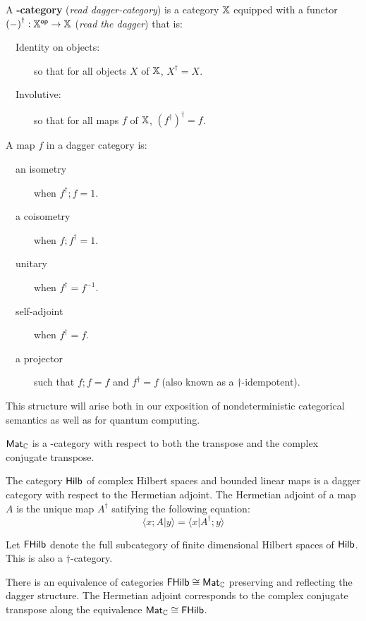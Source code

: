 \begin{definition}
A {\bf \dag-category} ({\em read dagger-category}) is a category $\mathbb{X}$ equipped with a functor ${(-)}^\dag:\mathbb{X}^{\mathsf{op}}\to\mathbb{X}$ ({\em read the dagger}) that is:

\begin{description}
\item[\ \ Identity on objects:] so that for all objects $X$ of $\mathbb{X}$, $X^\dag = X$.
\item[\ \ Involutive:] so that for all maps $f$ of $\mathbb{X}$, $(f^\dag)^\dag = f$.
\end{description}

A map $f$ in a dagger category is:

\begin{description}
\item[\ \ an isometry] when $f^\dag; f = 1$.
\item[\ \ a coisometry] when $f; f^\dag = 1$.
\item[\ \ unitary] when $f^\dag = f^{-1}$.
\item[\ \ self-adjoint] when $f^\dag=f$.
\item[\ \ a projector] such that $f;f=f$ and $f^\dag=f$ (also known as a $\dag$-idempotent).
\end{description}

\end{definition}

This structure will arise both in our exposition of nondeterministic categorical semantics as well as for quantum computing.


\begin{example}
 $\mathsf{Mat}_{\mathbb{C}}$ is a \dag-category with respect to both the transpose and the complex conjugate transpose.
\end{example}

\begin{example}

The category $\mathsf{Hilb}$ of complex Hilbert spaces and bounded linear maps is a dagger category with respect to the Hermetian adjoint.  The Hermetian adjoint of a map $A$ is the unique map $A^\dag$ satifying the following equation:
$$
\langle x;A|y\rangle = \langle x | A^\dag; y \rangle
$$


Let $\mathsf{FHilb}$ denote the full subcategory of finite dimensional Hilbert spaces of $\mathsf{Hilb}$.  This is also a $\dag$-category.
\end{example}

\begin{lemma}
There is an equivalence of categories $\mathsf{FHilb} \cong \mathsf{Mat}_{\mathbb{C}}$ preserving and reflecting the dagger structure.
The Hermetian adjoint corresponds to the complex conjugate transpose along the equivalence $\mathsf{Mat}_{\mathbb{C}} \cong \mathsf{FHilb}$.
\end{lemma}


